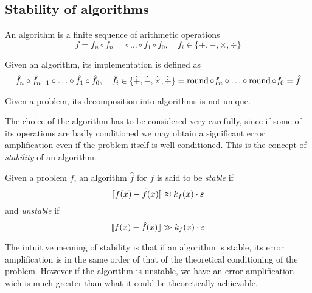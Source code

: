 \subsection{Stability of algorithms}
\begin{Def}[Algorithm]
	An algorithm is a finite sequence of arithmetic operations
	\begin{dmath*}
		f = f_n \circ f_{n-1} \circ \ldots \circ f_1 \circ f_0, \quad { f_i \in \{+,-,\times,\div\} }
	\end{dmath*}
\end{Def}
\begin{Def}[Implementation]
	Given an algorithm, its implementation is defined as
	\begin{dmath*}
		{ \hat{f}_n \circ \hat{f}_{n-1} \circ \ldots \circ \hat{f}_1 \circ \hat{f}_0, \quad \hat{f}_i \in \{\hat{+},\hat{-},\hat{\times},\hat{\div}\} }\\
		= \op{round} \circ f_n \circ \ldots \circ \op{round} \circ f_0
		= \hat{f}
	\end{dmath*}
\end{Def}
\begin{Rem}
	Given a problem, its decomposition into algorithms is not unique.
\end{Rem}
\begin{Rem}
	The choice of the algorithm has to be considered very carefully, since if some of its operations are badly conditioned we may obtain a significant error amplification even if the problem itself is well conditioned. This is the concept of \emph{stability} of an algorithm.
\end{Rem}
\begin{Def}[Stability]
	Given a problem $f$, an algorithm $\hat{f}$ for $f$ is said to be \emph{stable} if
	\begin{equation*}
		\llbracket f(x) - \hat{f}(x) \rrbracket \approx k_f(x) \cdot \varepsilon
	\end{equation*}
	and \emph{unstable} if
	\begin{equation*}
		\llbracket f(x) - \hat{f}(x) \rrbracket \gg k_f(x) \cdot \varepsilon
	\end{equation*}
\end{Def}
\begin{Rem}
	The intuitive meaning of stability is that if an algorithm is stable, its error amplification is in the same order of that of the theoretical conditioning of the problem. However if the algorithm is unstable, we have an error amplification wich is much greater than what it could be theoretically achievable.
\end{Rem}

